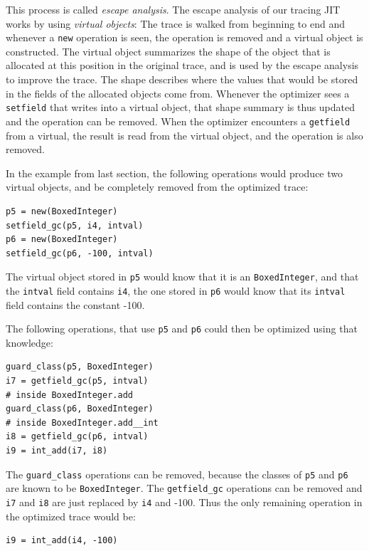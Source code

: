 \documentclass{sigplanconf}
\begin{document}
This process is called \emph{escape analysis}. The escape analysis of
our tracing JIT works by using \emph{virtual objects}: The trace is walked from
beginning to end and whenever a \texttt{new} operation is seen, the operation is
removed and a virtual object is constructed. The virtual object summarizes the
shape of the object that is allocated at this position in the original trace,
and is used by the escape analysis to improve the trace. The shape describes
where the values that would be stored in the fields of the allocated objects
come from. Whenever the optimizer sees a \texttt{setfield} that writes into a virtual
object, that shape summary is thus updated and the operation can be removed.
When the optimizer encounters a \texttt{getfield} from a virtual, the result is read
from the virtual object, and the operation is also removed.

In the example from last section, the following operations would produce two
virtual objects, and be completely removed from the optimized trace:

\begin{verbatim}
p5 = new(BoxedInteger)
setfield_gc(p5, i4, intval)
p6 = new(BoxedInteger)
setfield_gc(p6, -100, intval)
\end{verbatim}


The virtual object stored in \texttt{p5} would know that it is an \texttt{BoxedInteger}, and that
the \texttt{intval} field contains \texttt{i4}, the one stored in \texttt{p6} would know that
its \texttt{intval} field contains the constant -100.

The following operations, that use \texttt{p5} and \texttt{p6} could then be
optimized using that knowledge:

\begin{verbatim}
guard_class(p5, BoxedInteger)
i7 = getfield_gc(p5, intval)
# inside BoxedInteger.add
guard_class(p6, BoxedInteger)
# inside BoxedInteger.add__int
i8 = getfield_gc(p6, intval)
i9 = int_add(i7, i8)
\end{verbatim}

The \texttt{guard\_class} operations can be removed, because the classes of \texttt{p5} and
\texttt{p6} are known to be \texttt{BoxedInteger}. The \texttt{getfield\_gc} operations can be removed
and \texttt{i7} and \texttt{i8} are just replaced by \texttt{i4} and -100. Thus the only
remaining operation in the optimized trace would be:

\begin{verbatim}
i9 = int_add(i4, -100)
\end{verbatim}
    
\end{document}
